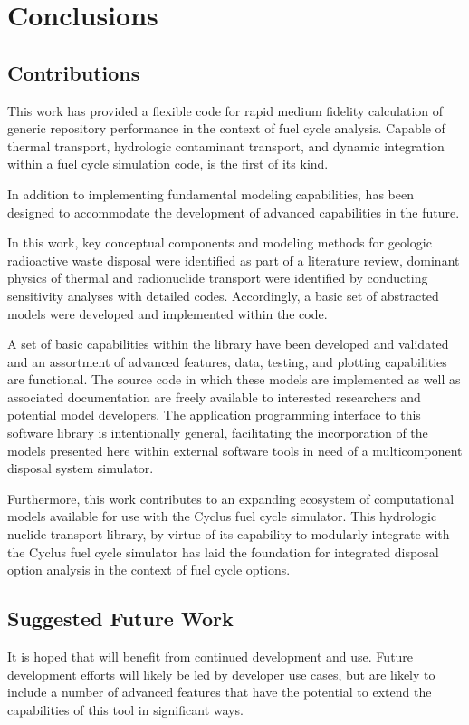 \chapter{Conclusions}\label{ch:conclusion}
\section{Contributions}

This work has provided a flexible code for rapid medium fidelity calculation of 
generic repository performance in the context of fuel cycle analysis.  Capable 
of thermal transport, hydrologic contaminant transport, and dynamic integration 
within a fuel cycle simulation code, \Cyder is the first of its kind.  

In addition to implementing fundamental modeling capabilities, \Cyder has been 
designed to accommodate the development of advanced capabilities in the future.

In this work, key conceptual components and modeling methods for geologic 
radioactive waste disposal were identified as part of a literature review, 
dominant physics of thermal and radionuclide transport were identified by 
conducting sensitivity analyses with detailed codes. Accordingly, a basic set 
of abstracted models were developed and implemented within the \Cyder code. 

A set of basic capabilities within the \Cyder library have been developed and
validated and an assortment of advanced features, data, testing, and plotting 
capabilities are functional.
The \Cyder source code in which these models are implemented as well as 
associated documentation are freely available to interested researchers and 
potential model developers. The application programming interface to this 
software library is intentionally general, facilitating the incorporation of 
the models presented here within external software tools in need of a 
multicomponent disposal system simulator. 

Furthermore, this work contributes to an expanding ecosystem of computational 
models available for use with the Cyclus fuel cycle simulator. This hydrologic 
nuclide transport library, by virtue of its capability to modularly integrate 
with the Cyclus fuel cycle simulator has laid the foundation for integrated 
disposal option analysis in the context of fuel cycle options. 

\section{Suggested Future Work}
It is hoped that \Cyder will benefit from continued development and use. Future 
development efforts will likely be led by developer use cases, but are likely 
to include a number of advanced features that have the potential to extend the 
capabilities of this tool in significant ways. 

